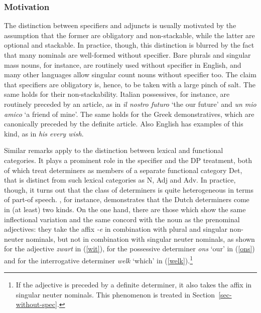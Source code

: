 \documentclass[output=paper
                ,modfonts
                ,nonflat
	        ,collection
	        ,collectionchapter
	        ,collectiontoclongg
 	        ,biblatex
                ,babelshorthands
                ,newtxmath
                ,draftmode
                ,colorlinks, citecolor=brown
]{./langsci/langscibook}
\begin{document}
\subsubsection{Motivation} 
\label{motiv}


The distinction between specifiers and adjuncts is usually motivated by 
the assumption that the former are obligatory and non-stackable, while the latter  
are optional and stackable. In practice, though, this distinction 
is blurred by the fact that many nominals are well-formed without specifier.
Bare plurals and singular mass nouns, for instance, are routinely used without 
specifier in English, and many other languages allow singular count nouns without 
specifier too. The claim that specifiers are obligatory is, hence, to be taken 
with a large pinch of salt. The same holds for their non-stackability. 
Italian possessives, for instance, are routinely preceded by an article, as in 
\emph{il nostro futuro} `the our future' and \emph{un mio amico} `a friend of mine'.     
The same holds for the Greek demonstratives, which are canonically preceded by the 
definite article. Also English has examples of this kind, as in \emph{his every wish}.    

Similar remarks apply to the distinction between lexical and functional categories. 
It plays a prominent role in the specifier and the DP treatment, both of which treat 
determiners as members of a separate functional category Det, that is distinct from 
such lexical categories as N, Adj and Adv.
In practice, though, it turns out that the class of determiners is quite heterogeneous in 
terms of part-of speech. \citet{VanEynde06}, for instance, demonstrates that the 
Dutch determiners come in (at least) two kinds. On the one hand, there are those 
which show the same inflectional variation and the same concord with the noun as the 
prenominal adjectives: they take the affix \emph{-e} in combination with plural 
and singular non-neuter nominals, but not in combination with singular 
neuter nominals, as shown for the adjective \emph{zwart} in (\ref{wit}), 
for the possessive determiner \emph{ons} `our' in (\ref{ons}) and for the 
interrogative determiner \emph{welk} `which' in (\ref{welk}).\footnote{If the adjective 
is preceded by a definite determiner, 
it also takes the affix in singular neuter nominals. This phenomenon is treated 
in Section~\ref{sec-without-spec}.} 
\end{document}
